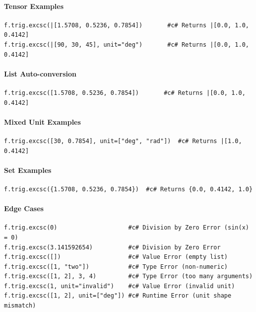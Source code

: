 \paragraph{Tensor Examples}
\begin{verbatim}
f.trig.excsc(|[1.5708, 0.5236, 0.7854])       #c# Returns |[0.0, 1.0, 0.4142]
f.trig.excsc(|[90, 30, 45], unit="deg")       #c# Returns |[0.0, 1.0, 0.4142]
\end{verbatim}

\paragraph{List Auto-conversion}
\begin{verbatim}
f.trig.excsc([1.5708, 0.5236, 0.7854])       #c# Returns |[0.0, 1.0, 0.4142]
\end{verbatim}

\paragraph{Mixed Unit Examples}
\begin{verbatim}
f.trig.excsc([30, 0.7854], unit=["deg", "rad"])  #c# Returns |[1.0, 0.4142]
\end{verbatim}

\paragraph{Set Examples}
\begin{verbatim}
f.trig.excsc({1.5708, 0.5236, 0.7854})  #c# Returns {0.0, 0.4142, 1.0}
\end{verbatim}

\paragraph{Edge Cases}
\begin{verbatim}
f.trig.excsc(0)                    #c# Division by Zero Error (sin(x) = 0)
f.trig.excsc(3.141592654)          #c# Division by Zero Error
f.trig.excsc([])                   #c# Value Error (empty list)
f.trig.excsc([1, "two"])           #c# Type Error (non-numeric)
f.trig.excsc([1, 2], 3, 4)         #c# Type Error (too many arguments)
f.trig.excsc(1, unit="invalid")    #c# Value Error (invalid unit)
f.trig.excsc([1, 2], unit=["deg"]) #c# Runtime Error (unit shape mismatch)
\end{verbatim}

